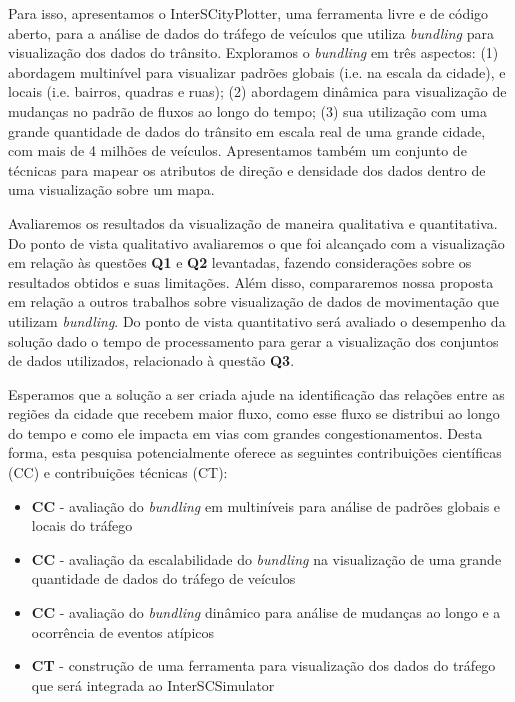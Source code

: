  Para isso, apresentamos o InterSCityPlotter, uma ferramenta livre e de código
aberto, para a análise de dados do tráfego de veículos que utiliza
\emph{bundling} para visualização dos dados do trânsito.  Exploramos o
\emph{bundling} em três aspectos: (1) abordagem multinível para visualizar
padrões globais (i.e. na escala da cidade), e locais (i.e. bairros, quadras e
ruas); (2) abordagem dinâmica para visualização de mudanças no padrão de fluxos
ao longo do tempo; (3) sua utilização com uma grande quantidade de dados do
trânsito em escala real de uma grande cidade, com mais de 4 milhões de
veículos.  Apresentamos também um conjunto de técnicas para mapear os atributos
de direção e densidade dos dados dentro de uma visualização sobre um mapa.

  Avaliaremos os resultados da visualização de maneira qualitativa e
quantitativa. Do ponto de vista qualitativo avaliaremos o que foi alcançado com
a visualização em relação às questões \textbf{Q1} e \textbf{Q2}
levantadas, fazendo considerações sobre os resultados obtidos e suas
limitações. Além disso, compararemos nossa proposta em relação a outros
trabalhos sobre visualização de dados de movimentação que utilizam
\emph{bundling}. Do ponto de vista quantitativo será avaliado o desempenho da
solução dado o tempo de processamento para gerar a visualização dos conjuntos
de dados utilizados, relacionado à questão \textbf{Q3}.

  Esperamos que a solução a ser criada ajude na identificação das relações
entre as regiões da cidade que recebem maior fluxo, como esse fluxo se
distribui ao longo do tempo e como ele impacta em vias com grandes
congestionamentos. Desta forma, esta pesquisa potencialmente oferece as
seguintes contribuições científicas (CC) e contribuições técnicas (CT):

\begin{itemize}
  \item \textbf{CC} - avaliação do \emph{bundling} em multiníveis para análise de
padrões globais e locais do tráfego

  \item \textbf{CC} - avaliação da escalabilidade do \emph{bundling} na visualização de uma grande
quantidade de dados do tráfego de veículos

  \item \textbf{CC} - avaliação do \emph{bundling} dinâmico para análise de mudanças ao longo
e a ocorrência de eventos atípicos

  \item \textbf{CT} - construção de uma ferramenta para visualização dos dados do tráfego
que será integrada ao InterSCSimulator
\end{itemize}

